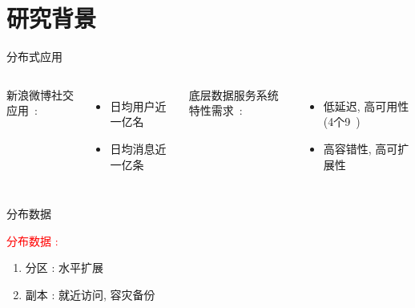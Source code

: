 \section{研究背景}

\begin{frame}{分布式应用}
  \vspace{0.50cm}

  \begin{columns}
	新浪微博社交应用~\footnotemark:
	\begin{itemize}
	  \item 日均用户近一亿名
	  \item 日均消息近一亿条
	\end{itemize}

	底层数据服务系统特性需求~: 
	\begin{itemize}
	  \item 低延迟, 高可用性 (4个9~\footnotemark)
	  \item 高容错性, 高可扩展性
	\end{itemize}
  \end{columns}
  
\end{frame}
\begin{frame}{分布数据}
  \graphicspath{{tikz-in-beamer/}}
  \begin{figure}[h!]
    \centering
    \begin{adjustbox}{max totalsize = {0.50\textwidth}{1.00\textheight}, center}
	  
    \end{adjustbox}
  \end{figure}

  \textcolor{red}{分布数据 :}
  \begin{enumerate}
	\item<2-> 分区 : 水平扩展
	\item<3-> 副本 : 就近访问, 容灾备份
  \end{enumerate}
\end{frame}
